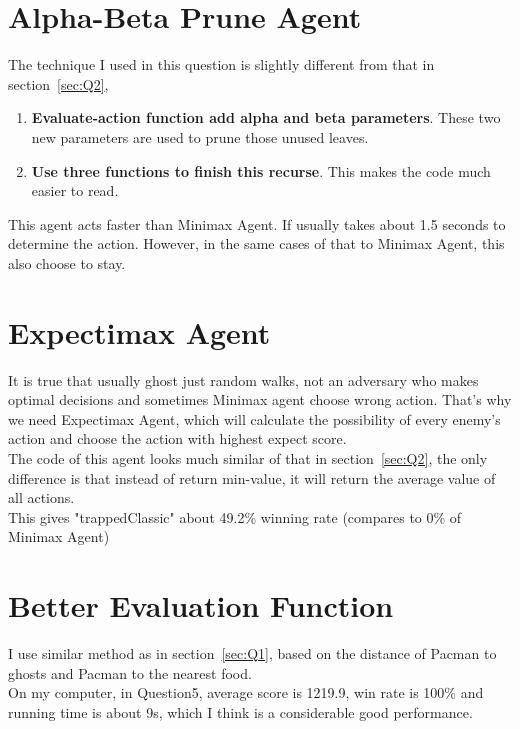 \documentclass{article}
\begin{document}
	\section{Alpha-Beta Prune Agent}
	\label{sec:Q3}
	The technique I used in this question is slightly different from that in section~\ref{sec:Q2},
	\begin{enumerate}
		\item \textbf{Evaluate-action function add alpha and beta parameters}. These two new parameters are used to prune those unused leaves.
		\item \textbf{Use three functions to finish this recurse}. This makes the code much easier to read.
	\end{enumerate}
	This agent acts faster than Minimax Agent. If usually takes about 1.5 seconds to determine the action. However, in the same cases of that to Minimax Agent, this also choose to stay.
	\section{Expectimax Agent}
	\label{sec:Q4}
	It is true that usually ghost just random walks, not an adversary who makes optimal decisions and sometimes Minimax agent choose wrong action. That's why we need Expectimax Agent, which will calculate the possibility of every enemy's action and choose the action with highest expect score.\\
	The code of this agent looks much similar of that in section~\ref{sec:Q2}, the only difference is that instead of return min-value, it will return the average value of all actions.\\
	This gives "trappedClassic" about 49.2\% winning rate (compares to 0\% of Minimax Agent)
	\section{Better Evaluation Function}
	\label{sec:Q5}
	I use similar method as in section~\ref{sec:Q1}, based on the distance of Pacman to ghosts and Pacman to the nearest food.\\
	On my computer, in Question5, average score is 1219.9, win rate is 100\% and running time is about 9s, which I think is a considerable good performance.
\end{document}
